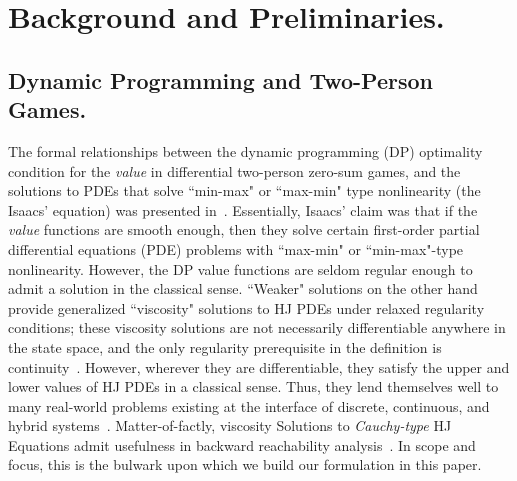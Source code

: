 \section{Background and Preliminaries.}
\label{sec:related}

\subsection{Dynamic Programming and Two-Person Games.}

\noindent The formal relationships between the dynamic programming (DP) optimality condition for the \textit{value} in differential two-person zero-sum games, and the solutions to PDEs that solve ``min-max" or ``max-min" type nonlinearity (the Isaacs' equation) was presented in~\cite{Isaacs1965}. Essentially, Isaacs' claim was that if the \textit{value} functions are smooth enough, then they solve certain first-order partial differential equations (PDE) problems with  ``max-min" or ``min-max"-type nonlinearity.  However, the DP value functions are seldom regular enough to admit a solution in the classical sense.  ``Weaker" solutions on the other hand~\cite{Lions1982, Evans1984, Crandall1984, CrandallLaxFriedrichs, Souganidis} provide generalized ``viscosity" solutions to HJ PDEs under relaxed regularity conditions; these viscosity solutions are not necessarily differentiable anywhere in the state space, and the only regularity prerequisite in the definition is continuity~\cite{Crandall1983viscosity}. However, wherever they are differentiable, they satisfy the  upper and lower values of HJ PDEs in a classical sense. Thus, they lend themselves well to many real-world problems existing at the interface of discrete, continuous, and hybrid systems~\cite{LygerosReachability, OsherFronts, Mitchell2020, Souganidis, Mitchell2005}. Matter-of-factly, viscosity Solutions to \textit{Cauchy-type} HJ Equations admit usefulness in backward reachability analysis~\cite{Mitchell2005}. In scope and focus, this is the bulwark upon which we build our formulation in this paper.



